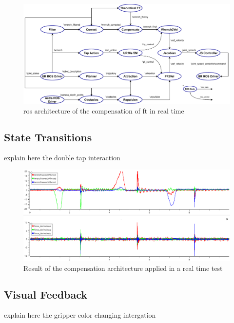 \begin{figure}[h]
    \centering
    \includegraphics[width=\linewidth]{figs/chp5/ros_cobot_arch.pdf}
    \caption{\ac{ros} architecture of the compensation of \ac{ft} in real time}
    \label{fig:ros_cobot_arch}
\end{figure}


\subsection{State Transitions}

\par explain here the double tap interaction

\begin{figure}[h]
    \centering
    \includegraphics[width=0.9\linewidth]{figs/chp5/taps.png}
    \caption{Result of the compensation architecture applied in a real time test}
    \label{fig:taps}
\end{figure}

\subsection{Visual Feedback}

\par explain here the gripper color changing intergation

